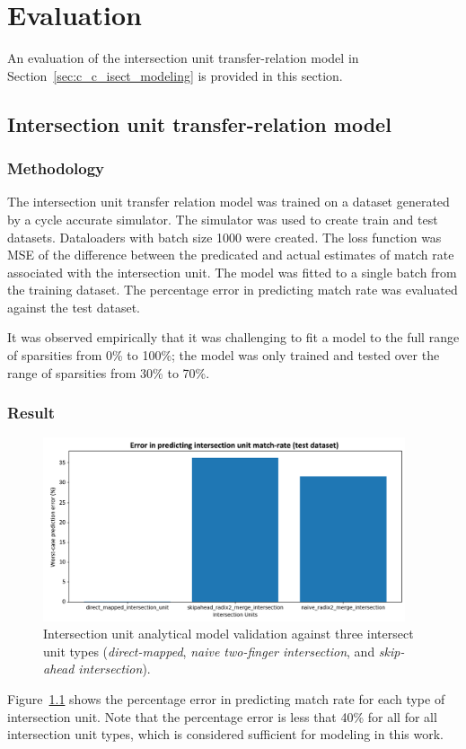 \chapter{Evaluation}
\label{chapter:evaluation}

An evaluation of the intersection unit transfer-relation model in Section~\ref{sec:c_c_isect_modeling} is provided in this section.

\section{Intersection unit transfer-relation model}

\subsection{Methodology}

The intersection unit transfer relation model was trained on a dataset generated by a cycle accurate simulator. The simulator was used to create train and test datasets. Dataloaders with batch size 1000 were created. The loss function was MSE of the difference between the predicated and actual estimates of match rate associated with the intersection unit. The model was fitted to a single batch from the training dataset. The percentage error in predicting match rate was evaluated against the test dataset.

It was observed empirically that it was challenging to fit a model to the full range of sparsities from 0\% to 100\%; the model was only trained and tested over the range of sparsities from 30\% to 70\%.

\subsection{Result}

\begin{figure}[ht]
    \centering
    \includegraphics[width=0.95\textwidth]{figures/isect_test_error.png}
    \caption{Intersection unit analytical model validation against three intersect unit types (\textit{direct-mapped}, \textit{naive two-finger intersection}, and \textit{skip-ahead intersection}).}
    \label{fig:isect_test_error}
\end{figure}

Figure~\ref{fig:isect_test_error} shows the percentage error in predicting match rate for each type of intersection unit. Note that the percentage error is less that 40\% for all for all intersection unit types, which is considered sufficient for modeling in this work.